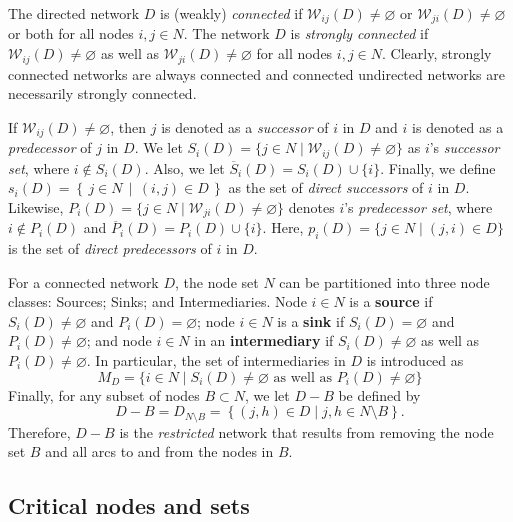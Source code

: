 The directed network $D$ is (weakly) \emph{connected} if $\mathcal{W}_{ij}(D) \neq \varnothing$ or $\mathcal{W}_{ji}(D) \neq \varnothing$ or both for all nodes $i,j \in N$. The network $D$ is \emph{strongly connected} if $\mathcal{W}_{ij}(D) \neq \varnothing$ as well as $\mathcal{W}_{ji}(D) \neq \varnothing$ for all nodes $i,j \in N$. Clearly, strongly connected networks are always connected and connected undirected networks are necessarily strongly connected.

If $\mathcal{W}_{ij} (D) \neq \varnothing$, then $j$ is denoted as a \textit{successor} of $i$ in $D$ and $i$ is denoted as a \textit{predecessor} of $j$ in $D$. We let $S_{i}(D)= \{j \in N \mid \mathcal{W}_{ij}(D) \neq \varnothing \}$ as $i$'s \textit{successor set}, where $i \notin S_{i}(D)$. Also, we let $\overline{S}_{i}(D) = S_{i}(D) \cup \{i\}$. Finally, we define $s_{i}(D) = \left\{\, j \in N \,\middle|\, (i,j) \in D \,\right\}$ as the set of \textit{direct successors} of $i$ in $D$. Likewise, $P_{i}(D)=\{j \in N \mid \mathcal{W}_{ji}(D) \neq \varnothing \}$ denotes $i$'s \textit{predecessor set}, where $i \notin P_{i}(D)$ and $\overline{P}_{i}(D) = P_{i}(D) \cup \{i\}$. Here, $p_{i}(D)=\{j \in N \mid (j,i) \in D\}$ is the set of \textit{direct predecessors} of $i$ in $D$.

For a connected network $D$, the node set $N$ can be partitioned into three node classes: Sources; Sinks; and Intermediaries. Node $i \in N$ is a \textbf{source} if $S_{i}(D) \neq \varnothing$ and $P_{i}(D) = \varnothing$; node $i \in N$ is a \textbf{sink} if $S_{i}(D) = \varnothing$ and $P_{i}(D) \neq \varnothing$; and node $i \in N$ in an \textbf{intermediary} if $S_{i}(D) \neq \varnothing$ as well as $P_{i}(D) \neq \varnothing$. In particular, the set of intermediaries in $D$ is introduced as
\begin{equation}
M_D = \{ i \in N \mid S_{i}(D) \neq \varnothing \mbox{ as well as } P_{i}(D) \neq \varnothing \}
\end{equation}
Finally, for any subset of nodes $B \subset N$, we let $D-B$ be defined by
\begin{equation}
D - B = D_{N \setminus B} = \left\{ (j,h) \in D \mid j,h \in N \setminus B \right\} .
\end{equation}
Therefore, $D - B$ is the \emph{restricted} network that results from removing the node set $B$ and all arcs to and from the nodes in $B$.

\subsection{Critical nodes and sets}

